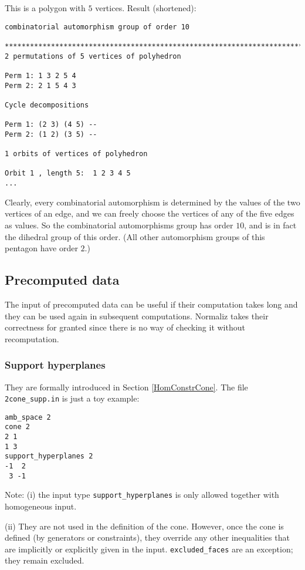 \documentclass[12pt,a4paper]{scrartcl}
\theoremstyle{definition}
\begin{document}
{This is a polygon with $5$ vertices. Result (shortened):
\begin{Verbatim}
combinatorial automorphism group of order 10

************************************************************************
2 permutations of 5 vertices of polyhedron

Perm 1: 1 3 2 5 4
Perm 2: 2 1 5 4 3

Cycle decompositions 

Perm 1: (2 3) (4 5) --
Perm 2: (1 2) (3 5) --

1 orbits of vertices of polyhedron

Orbit 1 , length 5:  1 2 3 4 5
...
\end{Verbatim}


Clearly, every combinatorial automorphism is determined by the values of the two vertices of an edge, and we can freely choose the vertices of any of the five edges as values. So the combinatorial automorphisms group has order $10$, and is in fact the dihedral group of this order. (All other automorphism groups of this pentagon have order $2$.)


\subsection{Precomputed data}

The input of precomputed data can be useful if their computation takes long and they can be used again in subsequent computations. Normaliz takes their correctness for granted since there is no way of checking it without recomputation.

\subsubsection{Support hyperplanes}\label{supphyp_ex}

They are formally introduced in Section \ref{HomConstrCone}.
The file \verb|2cone_supp.in| is just a toy example:
\begin{Verbatim}
amb_space 2
cone 2
2 1
1 3
support_hyperplanes 2
-1  2
 3 -1
\end{Verbatim}

Note: (i) the input type \verb|support_hyperplanes| is only allowed together with homogeneous input.

(ii) They are not used in the definition of the cone. However, once the cone is defined (by generators or constraints), they override any other inequalities that are implicitly or explicitly given in the input. \verb|excluded_faces| are an exception; they remain excluded.

}
\end{document}
